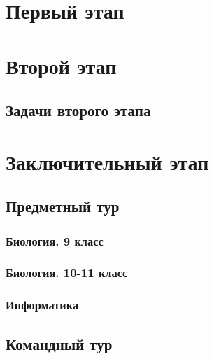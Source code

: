 \documentclass[a4paper,12pt,oneside]{book}
\begin{document}

\setcounter{tocdepth}{1}

\tableofcontents

\part{Первый этап}




\part{Второй этап}
\clearpage
\chapter{Задачи второго этапа}


\part{Заключительный этап}

\clearpage
\chapter{Предметный тур}

\section{Биология. 9 класс}


\section{Биология. 10-11 класс}


\section{Информатика}


\chapter{Командный тур}



\end{document}
